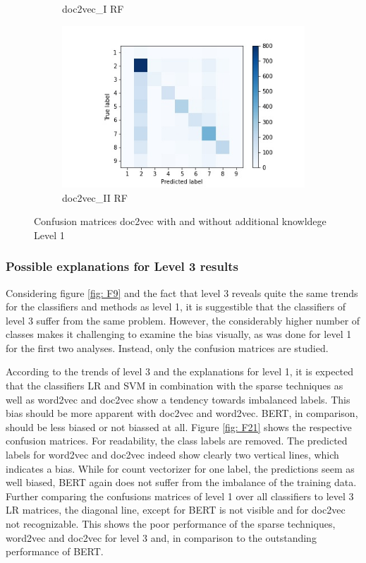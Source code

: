 \documentclass[12pt, a4paper, titlepage]{article}
\begin{document}
\begin{figure}
\begin{subfigure}[b]{0.475\textwidth}
    {{\small doc2vec\_I \ac{RF}}}    
  \end{subfigure}
  \hfill
  \begin{subfigure}[b]{0.475\textwidth}   
      \centering 
      \includegraphics[width=\textwidth]{cm_doc2vec_with_RF.jpg}
      {{\small doc2vec\_II \ac{RF}}}    
  \end{subfigure}
  \caption{\label{fig: F24} Confusion matrices doc2vec with and without additional knowldege Level 1}
\end{figure}


\subsubsection*{Possible explanations for Level 3 results}
Considering figure \ref{fig: F9} and the fact that level 3 reveals quite the same trends for the classifiers and methods as level 1, it is suggestible that the classifiers of level 3 suffer from the same problem. However, the considerably higher number of classes makes it challenging to examine the bias visually, as was done for level 1 for the first two analyses. Instead, only the confusion matrices are studied.

According to the trends of level 3 and the explanations for level 1, it is expected that the classifiers \ac{LR} and \ac{SVM} in combination with the sparse techniques as well as word2vec and doc2vec show a tendency towards imbalanced labels. This bias should be more apparent with doc2vec and word2vec. \ac{BERT}, in comparison, should be less biased or not biassed at all. Figure \ref{fig: F21} shows the respective confusion matrices. For readability, the class labels are removed. The predicted labels for word2vec and doc2vec indeed show clearly two vertical lines, which indicates a bias. While for count vectorizer for one label, the predictions seem as well biased, \ac{BERT} again does not suffer from the imbalance of the training data. Further comparing the confusions matrices of level 1 over all classifiers to level 3 \ac{LR} matrices, the diagonal line, except for \ac{BERT} is not visible and for doc2vec not recognizable. This shows the poor performance of the sparse techniques, word2vec and doc2vec for level 3 and, in comparison to the outstanding performance of \ac{BERT}. 
\end{document}
